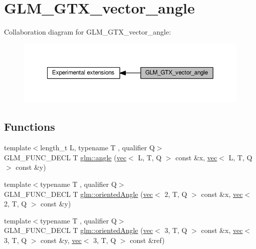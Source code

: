 \hypertarget{group__gtx__vector__angle}{}\section{G\+L\+M\+\_\+\+G\+T\+X\+\_\+vector\+\_\+angle}
\label{group__gtx__vector__angle}
Collaboration diagram for G\+L\+M\+\_\+\+G\+T\+X\+\_\+vector\+\_\+angle\+:
\nopagebreak
\begin{figure}[H]
\begin{center}
\leavevmode
\includegraphics[width=350pt]{de/de7/group__gtx__vector__angle}
\end{center}
\end{figure}
\subsection*{Functions}
\begin{DoxyCompactItemize}
\item 
{\footnotesize template$<$length\+\_\+t L, typename T , qualifier Q$>$ }\\G\+L\+M\+\_\+\+F\+U\+N\+C\+\_\+\+D\+E\+CL T \hyperlink{group__gtx__vector__angle_ga2e2917b4cb75ca3d043ac15ff88f14e1}{glm\+::angle} (\hyperlink{structglm_1_1vec}{vec}$<$ L, T, Q $>$ const \&x, \hyperlink{structglm_1_1vec}{vec}$<$ L, T, Q $>$ const \&y)
\item 
{\footnotesize template$<$typename T , qualifier Q$>$ }\\G\+L\+M\+\_\+\+F\+U\+N\+C\+\_\+\+D\+E\+CL T \hyperlink{group__gtx__vector__angle_ga9556a803dce87fe0f42fdabe4ebba1d5}{glm\+::oriented\+Angle} (\hyperlink{structglm_1_1vec}{vec}$<$ 2, T, Q $>$ const \&x, \hyperlink{structglm_1_1vec}{vec}$<$ 2, T, Q $>$ const \&y)
\item 
{\footnotesize template$<$typename T , qualifier Q$>$ }\\G\+L\+M\+\_\+\+F\+U\+N\+C\+\_\+\+D\+E\+CL T \hyperlink{group__gtx__vector__angle_ga706fce3d111f485839756a64f5a48553}{glm\+::oriented\+Angle} (\hyperlink{structglm_1_1vec}{vec}$<$ 3, T, Q $>$ const \&x, \hyperlink{structglm_1_1vec}{vec}$<$ 3, T, Q $>$ const \&y, \hyperlink{structglm_1_1vec}{vec}$<$ 3, T, Q $>$ const \&ref)
\end{DoxyCompactItemize}


